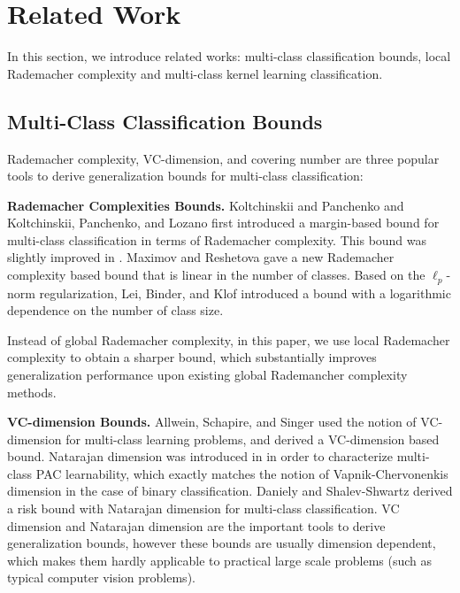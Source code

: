 \documentclass{article}
\begin{document}
\section{Related Work}
In this section,
we  introduce related works:
multi-class classification bounds,
local Rademacher complexity and multi-class kernel learning classification.

\subsection{Multi-Class Classification Bounds}
 Rademacher complexity, VC-dimension, and covering number are three
 popular tools to derive generalization bounds for multi-class classification:

\textbf{Rademacher Complexities Bounds.}
   Koltchinskii and Panchenko 
    and Koltchinskii, Panchenko, and Lozano 
    first introduced a margin-based bound for multi-class classification in terms of Rademacher complexity.
    This bound was slightly improved in \cite{mohri2012foundations,cortes2013multi}.
    Maximov and Reshetova  gave a new Rademacher complexity based bound
    that is linear in the number of classes.
    Based on the $\ell_p$-norm regularization,
    Lei, Binder, and Klof  introduced a bound
    with a logarithmic dependence on the number of class size.

    Instead of global Rademacher complexity,
    in this paper, we use local Rademacher complexity
    to obtain a sharper bound, which  substantially improves
    generalization performance upon existing global Rademancher complexity methods.

\textbf{VC-dimension Bounds.}
    Allwein, Schapire, and Singer   used the notion of VC-dimension
    for multi-class learning problems,
    and derived a VC-dimension based bound.
    Natarajan dimension was introduced in \cite{Natarajan1989} in
    order to characterize multi-class PAC learnability,
    which exactly matches the notion of Vapnik-Chervonenkis
    dimension in the case of binary classification.
    Daniely and Shalev-Shwartz  derived a risk bound with Natarajan dimension for multi-class classification.
    VC dimension and Natarajan dimension are the important tools to derive generalization bounds,
    however these bounds are usually dimension
    dependent, which makes them hardly applicable to practical large scale problems (such as typical computer vision problems).
\end{document}
